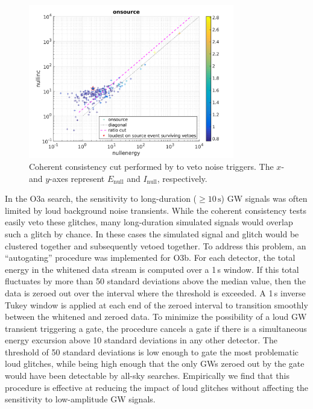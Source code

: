 \begin{figure}[h]
	\includegraphics[width=0.8\textwidth]{figures/grb/coh-cut.png}
	\caption[Coherent consistency cut performed by \xpip to veto noise triggers.]{Coherent consistency cut performed by \xpip to veto noise triggers. The $x$- and $y$-axes represent $E_{\mathrm{null}}$ and $I_{\mathrm{null}}$, respectively.}
	\label{fig:coh-cut}
\end{figure}

In the O3a search, the sensitivity to long-duration ($\geq 10\,\text{s}$) GW signals was often limited by loud background noise transients.
While the coherent consistency tests easily veto these glitches, many long-duration simulated signals would overlap such a glitch by chance.
In these cases the simulated signal and glitch would be clustered together and subsequently vetoed together.
To address this problem, an ``autogating'' procedure was implemented for O3b. For each detector, the total energy in the whitened data stream is computed over a 1\,s window.
If this total fluctuates by more than 50 standard deviations above the median value, then the data is zeroed out over the interval where the threshold is exceeded.
A 1\,s inverse Tukey window is applied at each end of the zeroed interval to transition smoothly between the whitened and zeroed data.
To minimize the possibility of a loud GW transient triggering a gate, the procedure cancels a gate if there is a simultaneous energy excursion above 10 standard deviations in any other detector.
The threshold of 50 standard deviations is low enough to gate the most problematic loud glitches, while being high enough that the only GWs zeroed out by the gate would have been detectable by all-sky searches.
Empirically we find that this procedure is effective at reducing the impact of loud glitches without affecting the sensitivity to low-amplitude GW signals.


